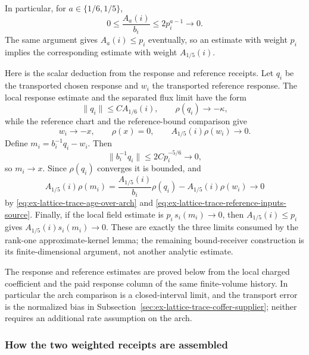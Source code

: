 In particular, for $a\in\{1/6,1/5\}$,
\begin{equation}
 0\le \frac{A_a(i)}{b_i}
 \le 2p_i^{a-1}\longrightarrow0.
 \label{eq:ex-lattice-trace-age-over-arch}
\end{equation}
The same argument gives $A_a(i)\le p_i$ eventually, so an estimate with
weight $p_i$ implies the corresponding estimate with weight $A_{1/5}(i)$.

Here is the scalar deduction from the response and reference receipts. Let
$q_i$ be the transported chosen response and $w_i$ the transported reference response. The local response estimate and the
separated flux limit have the form
\begin{equation}
 \|q_i\|\le C A_{1/6}(i),\qquad
 \rho(q_i)\longrightarrow-\kappa,
 \label{eq:ex-lattice-trace-response-inputs-source}
\end{equation}
while the reference chart and the reference-bound comparison give
\begin{equation}
 w_i\longrightarrow -x,\qquad \rho(x)=0,\qquad
 A_{1/5}(i)\rho(w_i)\longrightarrow0.
 \label{eq:ex-lattice-trace-reference-inputs-source}
\end{equation}
Define $m_i=b_i^{-1}q_i-w_i$. Then
\[
 \|b_i^{-1}q_i\|\le 2C p_i^{-5/6}\longrightarrow0,
\]
so $m_i\to x$. Since $\rho(q_i)$ converges it is bounded, and
\[
 A_{1/5}(i)\rho(m_i)
 =\frac{A_{1/5}(i)}{b_i}\rho(q_i)
   -A_{1/5}(i)\rho(w_i)\longrightarrow0
\]
by \eqref{eq:ex-lattice-trace-age-over-arch} and
\eqref{eq:ex-lattice-trace-reference-inputs-source}. Finally, if the local
field estimate is $p_i\,s_i(m_i)\to0$, then
$A_{1/5}(i)\le p_i$ gives $A_{1/5}(i)s_i(m_i)\to0$. These are exactly
the three limits consumed by the rank-one approximate-kernel lemma; the
remaining bound-receiver construction is its finite-dimensional argument,
not another analytic estimate.

The response and reference estimates are proved below from the local
charged coefficient and the paid response column of the same finite-volume
history. In particular the arch comparison is a closed-interval limit,
and the transport error is the normalized bias in Subsection~\ref{sec:ex-lattice-trace-coffer-supplier};
neither requires an additional rate assumption on the arch.

\subsubsection{How the two weighted receipts are assembled}
\label{subsec:ex-lattice-trace-weighted-assembly}

